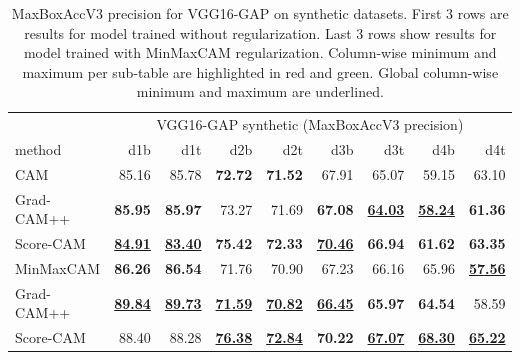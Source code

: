 \begin{table}[ht]
\centering
\begin{tabular}{lrrrrrrrr}
\toprule
 & \multicolumn{8}{c}{VGG16-GAP synthetic (MaxBoxAccV3 precision)} \\
method & d1b & d1t & d2b & d2t & d3b & d3t & d4b & d4t \\
\cmidrule(lr){1-1} \cmidrule(lr){2-9} 
CAM & 85.16 & 85.78 & \color{purple} \bfseries 72.72 & \color{purple} \bfseries 71.52 & 67.91 & 65.07 & 59.15 & 63.10 \\
Grad-CAM++ & \color{teal} \bfseries 85.95 & \color{teal} \bfseries 85.97 & 73.27 & 71.69 & \color{purple} \bfseries 67.08 & \color{purple} \bfseries \underline{64.03} & \color{purple} \bfseries \underline{58.24} & \color{purple} \bfseries 61.36 \\
Score-CAM & \color{purple} \bfseries \underline{84.91} & \color{purple} \bfseries \underline{83.40} & \color{teal} \bfseries 75.42 & \color{teal} \bfseries 72.33 & \color{teal} \bfseries \underline{70.46} & \color{teal} \bfseries 66.94 & \color{teal} \bfseries 61.62 & \color{teal} \bfseries 63.35 \\
\cmidrule(lr){1-1} \cmidrule(lr){2-9} 
MinMaxCAM & \color{purple} \bfseries 86.26 & \color{purple} \bfseries 86.54 & 71.76 & 70.90 & 67.23 & 66.16 & 65.96 & \color{purple} \bfseries \underline{57.56} \\
Grad-CAM++ & \color{teal} \bfseries \underline{89.84} & \color{teal} \bfseries \underline{89.73} & \color{purple} \bfseries \underline{71.59} & \color{purple} \bfseries \underline{70.82} & \color{purple} \bfseries \underline{66.45} & \color{purple} \bfseries 65.97 & \color{purple} \bfseries 64.54 & 58.59 \\
Score-CAM & 88.40 & 88.28 & \color{teal} \bfseries \underline{76.38} & \color{teal} \bfseries \underline{72.84} & \color{teal} \bfseries 70.22 & \color{teal} \bfseries \underline{67.07} & \color{teal} \bfseries \underline{68.30} & \color{teal} \bfseries \underline{65.22} \\
\bottomrule
\end{tabular}
\caption[MaxBoxAccV3 for VGG16-GAP on synthetic datasets]{MaxBoxAccV3 precision for VGG16-GAP on synthetic datasets. First 3 rows are results for model trained without regularization. Last 3 rows show results for model trained with MinMaxCAM regularization. Column-wise minimum and maximum per sub-table are highlighted in red and green. Global column-wise minimum and maximum are underlined.}
\label{tab:maxboxaccv3_precision_vgg16_gap_synthetic}
\end{table}

